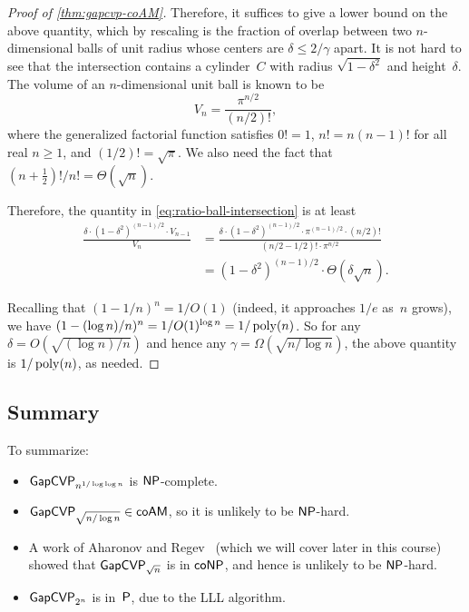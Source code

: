 \documentclass[11pt]{article}
\begin{document}
\begin{proof}[Proof of \cref{thm:gapcvp-coAM}]
  Therefore, it suffices to give a lower bound on the above quantity,
  which by rescaling is the fraction of overlap between two
  $n$-dimensional balls of unit radius whose centers are
  $\delta \leq 2/\gamma$ apart. It is not hard to see that the
  intersection contains a cylinder~$C$ with radius $\sqrt{1-\delta^2}$
  and height~$\delta$. The volume of an $n$-dimensional unit ball is
  known to be
  \[ V_n = \frac{\pi^{n/2}}{(n/2)!} , \] where the generalized
  factorial function satisfies $0! = 1$, $n! = n(n-1)!$ for all real
  $n \geq 1$, and $(1/2)! = \sqrt{\pi}$. We also need the fact that
  $(n+\frac{1}{2})!/{n!} = \Theta(\sqrt{n})$.

  Therefore, the quantity in \cref{eq:ratio-ball-intersection} is at
  least
  \begin{align*}
    \frac{\delta \cdot (1-\delta^{2})^{(n-1)/2} \cdot V_{n-1}}{V_{n}}
    &= \frac{\delta \cdot (1-\delta^{2})^{(n-1)/2} \cdot \pi^{(n-1)/2}
      \cdot (n/2)!}{(n/2-1/2)! \cdot \pi^{n/2}} \\
    &= (1-\delta^{2})^{(n-1)/2} \cdot \Theta(\delta \sqrt{n}).
  \end{align*}
  
  Recalling that $(1-1/n)^n = 1/O(1)$ (indeed, it approaches $1/e$
  as~$n$ grows), we have
  $(1 - (\log n)/n)^{n} = 1/O(1)^{\log n} = 1/\poly(n)$. So for any
  $\delta = O(\sqrt{(\log n)/n})$ and hence any
  $\gamma = \Omega(\sqrt{n/\log n})$, the above quantity is
  $1/\poly(n)$, as needed.
\end{proof}

\subsection{Summary}

To summarize:
\begin{itemize}
\item $\gapcvp_{n^{1/\log \log n}}$ is $\NP$-complete.
\item $\gapcvp_{\sqrt{n/\log n}} \in \coAM$, so it is unlikely to be
  $\NP$-hard.
\item A work of Aharonov and
  Regev~\cite{DBLP:journals/jacm/AharonovR05} (which we will cover
  later in this course) showed that $\gapcvp_{\sqrt{n}}$ is in
  $\coNP$, and hence is unlikely to be $\NP$-hard.
\item $\gapcvp_{2^n}$ is in~$\P$, due to the LLL algorithm.
\end{itemize}



\end{document}
